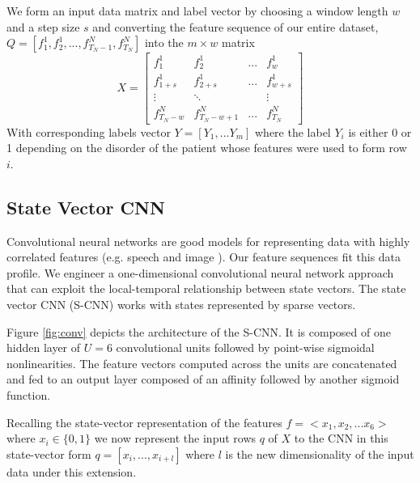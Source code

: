 \documentclass[10pt,twocolumn,letterpaper]{article}
\begin{document}
We form an input data matrix and label vector by choosing a window length $w$ and a step size $s$ and converting the feature sequence of our entire dataset, $Q=[f_1^1, f_2^1,...,f_{T_N-1}^N,f_{T_N}^N]$ into the $m \times w$ matrix
\begin{equation}
X = \begin{bmatrix}
f_1^1 & f_2^1  & ...  & f_w^1 \\ 
f_{1+s}^1 & f_{2+s}^1  & ...  & f_{w+s}^1 \\ 
\vdots  & \ddots  &  & \vdots  \\ 
f_{T_N-w}^N & f_{T_N-w + 1}^N  & ... & f_{T_N}^N
\end{bmatrix}
\end{equation}
With corresponding labels vector $Y=[Y_1,...Y_m]$ where the label $Y_i$ is either 0 or 1 depending on the disorder of the patient whose features were used to form row $i$. 

\subsection{State Vector CNN}
\label{sec:CNN}
Convolutional neural networks are good models for representing data with highly correlated features (e.g.  speech and image \cite{Krizhevsky:2012wl, hamidss, Bouvrie:2006vb,lecun}). Our feature sequences fit this data profile. We engineer a one-dimensional convolutional neural network approach that can exploit the local-temporal relationship between state vectors. The state vector CNN (S-CNN) works with states represented by sparse vectors. %


Figure \ref{fig:conv} depicts the architecture of the S-CNN. It is composed of one hidden layer of $U=6$ convolutional units followed by point-wise sigmoidal nonlinearities. The feature vectors computed across the units are concatenated and fed to an output layer composed of an affinity followed by another sigmoid function.

Recalling the state-vector representation of the features $f=<x_1,x_2,...x_6 >$ where $x_i \in \{0,1\}$ we now represent the input rows $q$ of $X$ to the CNN in this state-vector form $q=[x_i,...,x_{i+l}]$ where $l$ is the new dimensionality of the input data under this extension.
\end{document}

